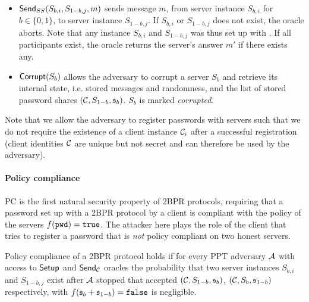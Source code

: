 \begin{itemize}
  \item $\mathsf{Send}_{SS}(S_{b,i},S_{1-b,j},m)$ sends message $m$, from server instance $S_{b,i}$ for $b\in\{0,1\}$, to server instance $S_{1-b,j}$.
        If $S_{b,i}$ or $S_{1-b,j}$ does not exist, the oracle aborts.
        Note that any instance $S_{b,i}$ and $S_{1-b,j}$ was thus set up with \Setup.
        If all participants exist, the oracle returns the server's answer $m'$ if there exists any.

  \item $\mathsf{Corrupt}(S_{b})$ allows the adversary to corrupt a server $S_b$ and retrieve its internal state, i.e. stored messages and randomness, and the list of stored password shares $(\mathcal{C}, S_{1-b}, \mathfrak{s}_b)$. %
      $S_b$ is marked \emph{corrupted}.
\end{itemize}

\noindent
Note that we allow the adversary to register passwords with servers such that we do not require the existence of a client instance $\mathcal{C}_i$ after a successful registration (client identities $\mathcal{C}$ are unique but not secret and can therefore be used by the adversary).

\paragraph{Policy compliance}
PC is the first natural security property of 2BPR protocols, requiring that a password set up with a 2BPR protocol by a client is compliant with the policy of the servers $f(\mathtt{pwd})=\mathtt{true}$.
The attacker here plays the role of the client that tries to register a password \pwd that is \emph{not} policy compliant on two honest servers.


\begin{definition}\label{def:pc}
Policy compliance of a 2BPR protocol holds if for every PPT adversary $\mathcal{A}$ with access to $\mathsf{Setup}$ and $\mathsf{Send}_\mathcal{C}$ oracles the probability that two server instances $S_{b,i}$ and $S_{1-b,j}$ exist after $\mathcal{A}$ stopped that accepted $(\mathcal{C},S_{1-b},\mathfrak{s}_b)$, $(\mathcal{C},S_{b},\mathfrak{s}_{1-b})$ respectively, with $f(\mathfrak{s}_b+\mathfrak{s}_{1-b})=\mathtt{false}$ is negligible.
\eod
\end{definition}


